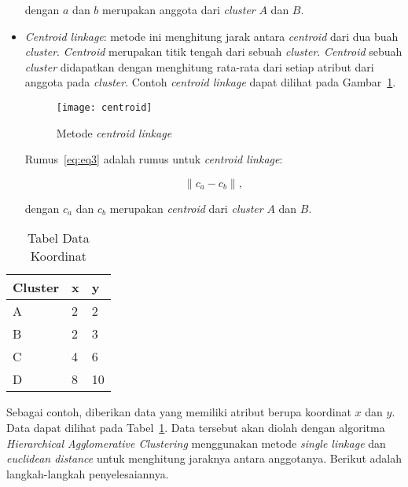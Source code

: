 \begin{itemize}
dengan $a$ dan $b$ merupakan anggota dari \textit{cluster} $A$ dan $B$.\\


\item \textit{Centroid linkage}: metode ini menghitung jarak antara \textit{centroid} dari dua buah \textit{cluster}.  \textit{Centroid} merupakan titik tengah dari sebuah \textit{cluster}. \textit{Centroid} sebuah \textit{cluster} didapatkan dengan menghitung rata-rata dari setiap atribut dari anggota pada \textit{cluster}. Contoh  \textit{centroid linkage} dapat dilihat pada Gambar~\ref{fig:centroid}. 

\begin{figure}[H]
    \centering  
    \texttt{[image: centroid]}  
    \caption[Metode \textit{centroid linkage} ]{Metode \textit{centroid linkage}} 
    \label{fig:centroid} 
\end{figure}

Rumus~\ref{eq:eq3} adalah rumus untuk \textit{centroid linkage}:

\begin{equation} \label{eq:eq3}
\| c_{a} - c_{b} \|, 
\end{equation}

dengan $c_{a}$ dan $c_{b}$ merupakan \textit{centroid} dari \textit{cluster} $A$ dan $B$.\\


\end{itemize}








\begin{table}[H] 
	\centering 
	\caption{Tabel Data Koordinat}
	\label{tab:data}
	\begin{tabular}{|p{1.5cm}|p{1cm}|p{1cm}|}

\hline
 Cluster & x & y \\
\hline
A & 2 & 2 \\
\hline
B & 2 & 3 \\
\hline
C & 4 & 6 \\
\hline
D & 8 & 10 \\
\hline

	\end{tabular} 
\end{table}

Sebagai contoh, diberikan data yang memiliki atribut berupa koordinat $x$ dan $y$. Data dapat dilihat pada Tabel~\ref{tab:data}. Data tersebut akan diolah dengan algoritma \textit{Hierarchical Agglomerative Clustering} menggunakan metode \textit{single linkage} dan \textit{euclidean distance} untuk menghitung jaraknya antara anggotanya. Berikut adalah langkah-langkah penyelesaiannya.



